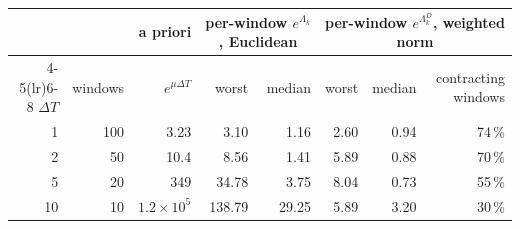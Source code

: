 \begin{tabular}{r r r rr rr r}
\toprule
& & a priori & \multicolumn{2}{c}{per-window $e^{\Lambda_k}$, Euclidean} & \multicolumn{3}{c}{per-window $e^{\Lambda^D_k}$, weighted norm}\\
\cmidrule(lr){4-5}\cmidrule(lr){6-8}
$\Delta T$ & windows & $e^{\mu\Delta T}$ & worst & median & worst & median & contracting windows\\
\midrule
1 & 100 & 3.23 & 3.10 & 1.16 & 2.60 & 0.94 & 74\,\% \\
2 & 50 & 10.4 & 8.56 & 1.41 & 5.89 & 0.88 & 70\,\% \\
5 & 20 & 349 & 34.78 & 3.75 & 8.04 & 0.73 & 55\,\% \\
10 & 10 & $1.2\times10^{5}$ & 138.79 & 29.25 & 5.89 & 3.20 & 30\,\% \\
\bottomrule
\end{tabular}
